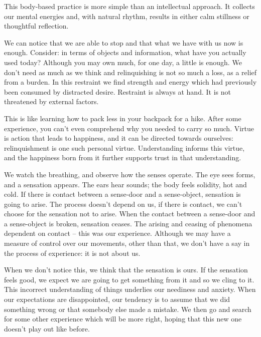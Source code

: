 This body-based practice is more simple than an intellectual approach.
It collects our mental energies and, with natural rhythm, results in
either calm stillness or thoughtful reflection.

We can notice that we are able to stop and that what we have with us now
is enough. Consider: in terms of objects and information, what have you
actually used today? Although you may own much, for one day, a little is
enough. We don't need as much as we think and relinquishing is not so
much a loss, as a relief from a burden. In this restraint we find
strength and energy which had previously been consumed by distracted
desire. Restraint is always at hand. It is not threatened by external
factors.

This is like learning how to pack less in your backpack for a hike.
After some experience, you can't even comprehend why you needed to carry
so much. Virtue is action that leads to happiness, and it can be
directed towards ourselves: relinquishment is one such personal virtue.
Understanding informs this virtue, and the happiness born from it
further supports trust in that understanding.

\clearpage

\vspace*{-\baselineskip}


We watch the breathing, and observe how the senses operate. The eye sees
forms, and a sensation appears. The ears hear sounds; the body feels
solidity, hot and cold. If there is contact between a sense-door and a
sense-object, sensation is going to arise. The process doesn't depend on
us, if there is contact, we can't choose for the sensation not to arise.
When the contact between a sense-door and a sense-object is broken,
sensation ceases. The arising and ceasing of phenomena dependent on
contact -- this was our experience. Although we may have a measure of
control over our movements, other than that, we don't have a say in the
process of experience: it is not about us.

When we don't notice this, we think that the sensation is ours. If the
sensation feels good, we expect we are going to get something from it
and so we cling to it. This incorrect understanding of things underlies
our neediness and anxiety. When our expectations are disappointed, our
tendency is to assume that we did something wrong or that somebody else
made a mistake. We then go and search for some other experience which
will be more right, hoping that this new one doesn't play out like
before.

